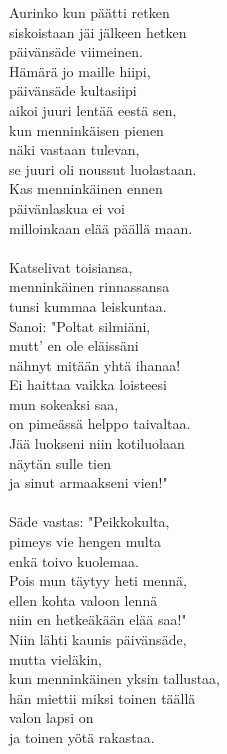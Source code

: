 
Aurinko kun päätti retken \\ siskoistaan jäi jälkeen hetken \\ päivänsäde viimeinen. \\ Hämärä jo maille hiipi, \\ päivänsäde kultasiipi \\ aikoi juuri lentää eestä sen, \\ kun menninkäisen pienen \\ näki vastaan tulevan, \\ se juuri oli noussut luolastaan. \\ Kas menninkäinen ennen \\ päivänlaskua ei voi \\ milloinkaan elää päällä maan. \\ \hspace{10mm} \\ Katselivat toisiansa, \\ menninkäinen rinnassansa \\ tunsi kummaa leiskuntaa. \\ Sanoi: "Poltat silmiäni, \\ mutt' en ole eläissäni \\ nähnyt mitään yhtä ihanaa! \\ Ei haittaa vaikka loisteesi \\ mun sokeaksi saa, \\ on pimeässä helppo taivaltaa. \\ Jää luokseni niin kotiluolaan \\ näytän sulle tien \\ ja sinut armaakseni vien!" \\ \hspace{10mm} \\ Säde vastas: "Peikkokulta, \\ pimeys vie hengen multa \\ enkä toivo kuolemaa. \\ Pois mun täytyy heti mennä, \\ ellen kohta valoon lennä \\ niin en hetkeäkään elää saa!" \\ Niin lähti kaunis päivänsäde, \\ mutta vieläkin, \\ kun menninkäinen yksin tallustaa, \\ hän miettii miksi toinen täällä \\ valon lapsi on \\ ja toinen yötä rakastaa.